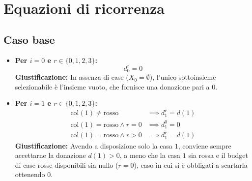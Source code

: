 \section{Equazioni di ricorrenza}

\subsection{Caso base}
\begin{itemize}
    \item \textbf{Per $i = 0$ e $r \in \{0, 1, 2, 3\}$:}
    \[
        d_0^r = 0
    \]
    \textbf{Giustificazione:} In assenza di case ($X_0 = \emptyset$), l'unico sottoinsieme selezionabile è l'insieme vuoto, che fornisce una donazione pari a $0$.

    \item \textbf{Per $i = 1$ e $r \in \{0, 1, 2, 3\}$:}
    \begin{align*}
        \text{col}(1) \neq \text{rosso} &\implies d_1^r = d(1) \\
        \text{col}(1) = \text{rosso} \land r = 0 &\implies d_1^0 = 0 \\
        \text{col}(1) = \text{rosso} \land r > 0 &\implies d_1^r = d(1)
    \end{align*}
    \textbf{Giustificazione:} Avendo a disposizione solo la casa $1$, conviene sempre accettarne la donazione $d(1) > 0$, a meno che la casa $1$ sia rossa e il budget di case rosse disponibili sia nullo ($r = 0$), caso in cui si è obbligati a scartarla ottenendo $0$.
\end{itemize}

